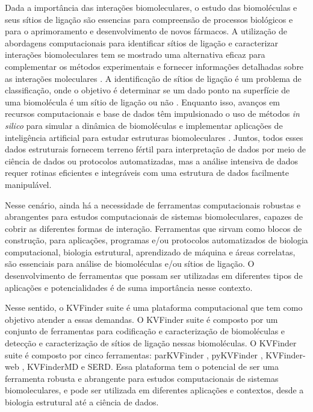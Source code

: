 \documentclass[Portugues]{phdquali}
\begin{document}
Dada a importância das interações biomoleculares, o estudo das biomoléculas e seus sítios de ligação são essencias para compreensão de processos biológicos e para o aprimoramento e desenvolvimento de novos fármacos. A utilização de abordagens computacionais para identificar sítios de ligação e caracterizar interações biomoleculares tem se mostrado uma alternativa eficaz para complementar os métodos experimentais e fornecer informações detalhadas sobre as interações moleculares \cite{simoes2017}. A identificação de sítios de ligação é um problema de classificação, onde o objetivo é determinar se um dado ponto na superfície de uma biomolécula é um sítio de ligação ou não \cite{sotriffer2002,henrich2010,simoes2017}. Enquanto isso, avanços em recursos computacionais e base de dados têm impulsionado o uso de métodos \textit{in silico} para simular a dinâmica de biomoléculas e implementar aplicações de inteligência artificial para estudar estruturas biomoleculares \cite{tunyasuvunakool2021}. Juntos, todos esses dados estruturais fornecem terreno fértil para interpretação de dados por meio de ciência de dados ou protocolos automatizadas, mas a análise intensiva de dados requer rotinas eficientes e integráveis com uma estrutura de dados facilmente manipulável.

Nesse cenário, ainda há a necessidade de ferramentas computacionais robustas e abrangentes para estudos computacionais de sistemas biomoleculares, capazes de cobrir as diferentes formas de interação. Ferramentas que sirvam como blocos de construção, para aplicações, programas e/ou protocolos automatizados de biologia computacional, biologia estrutural, aprendizado de máquina e áreas correlatas, são essenciais para análise de biomoléculas e/ou sítios de ligação. O desenvolvimento de ferramentas que possam ser utilizadas em diferentes tipos de aplicações e potencialidades é de suma importância nesse contexto.

Nesse sentido, o KVFinder suite é uma plataforma computacional que tem como objetivo atender a essas demandas. O KVFinder suite é composto por um conjunto de ferramentas para codificação e caracterização de biomoléculas e detecção e caracterização de sítios de ligação nessas biomoléculas. O KVFinder suite é composto por cinco ferramentas: parKVFinder \cite{guerra2020}, pyKVFinder \cite{guerra2021}, KVFinder-web \cite{guerra2023A}, KVFinderMD e SERD. Essa plataforma tem o potencial de ser uma ferramenta robusta e abrangente para estudos computacionais de sistemas biomoleculares, e pode ser utilizada em diferentes aplicações e contextos, desde a biologia estrutural até a ciência de dados.
\end{document}
